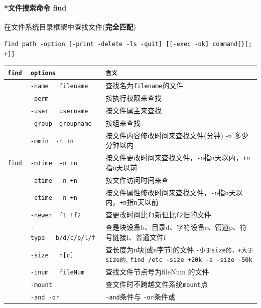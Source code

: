 \documentclass[UTF8,a4paper,12pt]{ctexbook}
\begin{document}
		\paragraph{*文件搜索命令 find}	在文件系统目录框架中查找文件(\textbf{完全匹配})
		
			\hspace{1cm} \verb|find path -option [-print -delete -ls -quit] [[-exec -ok] command{}[; +]]| 
	
			\begin{table}[H]
				\centering
				\begin{tabular}{l|m{7cm}|m{8cm}}
					\hline
					\verb|find |   	   & \verb|options| & \verb|含义|\\
					\hline
					\verb| |   	   & \verb|-name   filename |& 	查找名为\verb|filename|的文件	\\
					\verb| |   	   & \verb|-perm | & 			按执行权限来查找	\\
					\verb| |   	   & \verb|-user   username | & 按文件属主来查找					\\
					\verb| |   	   & \verb|-group  groupname | &按组来查找 					\\
					\verb| |   	   & \verb|-mmin  -n +n | & 	按文件内容修改时间来查找文件(分钟)	-n 多少分钟以内		\\
					\verb|find |   & \verb|-mtime  -n +n | & 	按文件更改时间来查找文件，\verb|-n|指\verb|n|天以内，\verb|+n|指\verb|n|天以前				\\
					\verb| |   	   & \verb|-atime  -n +n | &	按文件访问时间来查				\\
					\verb| |   	   & \verb|-ctime  -n +n | & 	按文件属性修改时间来查找文件，\verb|-n|指\verb|n|天以内，\verb|+n|指\verb|n|天以前				\\
					\verb| |   	   & \verb|-newer  f1 !f2| & 	查更改时间比\verb|f1|新但比\verb|f2|旧的文件				\\
					\verb| |   	   & \verb|-type   b/d/c/p/l/f |&查是块设备b、目录d、字符设备c、管道p、符号链接l、普通文件f 		\\
					\verb| |   	   & \verb|-size   n[c] | & 	查长度为\verb|n|块[或\verb|n|字节]的文件,\verb|-小于size的，+大于size的|, \verb|find /etc -size +20k -a -size -50k|	\\
					\verb| |	   & \verb|-inum   fileNum|			&   查找文件节点号为fileNum 的文件\\
					\verb| |   	   & \verb|-mount | & 			查文件时不跨越文件系统\verb|mount|点		\\
					\verb| |	   & \verb|-and -or| & \verb|-and|条件与 \verb|-or|条件或\\
					\hline
				\end{tabular}
			\end{table}	
			
\end{document}
